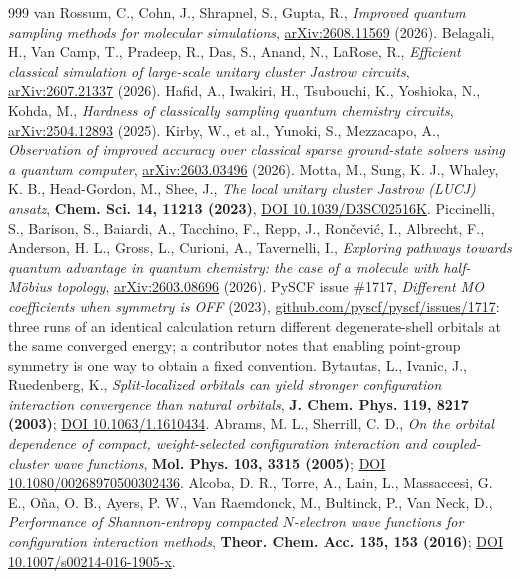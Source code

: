 \documentclass[onecolumn,a4paper]{quantumarticle}
\begin{document}
\begin{thebibliography}{999}
 van Rossum, C., Cohn, J., Shrapnel, S., Gupta, R., \emph{Improved quantum sampling methods for molecular simulations}, \href{https://arxiv.org/abs/2608.11569}{arXiv:2608.11569} (2026).
 Belagali, H., Van Camp, T., Pradeep, R., Das, S., Anand, N., LaRose, R., \emph{Efficient classical simulation of large-scale unitary cluster Jastrow circuits}, \href{https://arxiv.org/abs/2607.21337}{arXiv:2607.21337} (2026).
 Hafid, A., Iwakiri, H., Tsubouchi, K., Yoshioka, N., Kohda, M., \emph{Hardness of classically sampling quantum chemistry circuits}, \href{https://arxiv.org/abs/2504.12893}{arXiv:2504.12893} (2025).
 Kirby, W., et al., Yunoki, S., Mezzacapo, A., \emph{Observation of improved accuracy over classical sparse ground-state solvers using a quantum computer}, \href{https://arxiv.org/abs/2603.03496}{arXiv:2603.03496} (2026).
 Motta, M., Sung, K. J., Whaley, K. B., Head-Gordon, M., Shee, J., \emph{The local unitary cluster Jastrow (LUCJ) ansatz}, \textbf{Chem. Sci. 14, 11213 (2023)}, \href{https://doi.org/10.1039/D3SC02516K}{DOI 10.1039/D3SC02516K}.
 Piccinelli, S., Barison, S., Baiardi, A., Tacchino, F., Repp, J., Ron\v{c}evi\'c, I., Albrecht, F., Anderson, H. L., Gross, L., Curioni, A., Tavernelli, I., \emph{Exploring pathways towards quantum advantage in quantum chemistry: the case of a molecule with half-M\"obius topology}, \href{https://arxiv.org/abs/2603.08696}{arXiv:2603.08696} (2026).
 PySCF issue \#1717, \emph{Different MO coefficients when symmetry is OFF} (2023), \href{https://github.com/pyscf/pyscf/issues/1717}{github.com/pyscf/pyscf/issues/1717}: three runs of an identical calculation return different degenerate-shell orbitals at the same converged energy; a contributor notes that enabling point-group symmetry is one way to obtain a fixed convention.
 Bytautas, L., Ivanic, J., Ruedenberg, K., \emph{Split-localized orbitals can yield stronger configuration interaction convergence than natural orbitals}, \textbf{J. Chem. Phys. 119, 8217 (2003)}; \href{https://doi.org/10.1063/1.1610434}{DOI 10.1063/1.1610434}.
 Abrams, M. L., Sherrill, C. D., \emph{On the orbital dependence of compact, weight-selected configuration interaction and coupled-cluster wave functions}, \textbf{Mol. Phys. 103, 3315 (2005)}; \href{https://doi.org/10.1080/00268970500302436}{DOI 10.1080/00268970500302436}.
 Alcoba, D. R., Torre, A., Lain, L., Massaccesi, G. E., O\~na, O. B., Ayers, P. W., Van Raemdonck, M., Bultinck, P., Van Neck, D., \emph{Performance of Shannon-entropy compacted $N$-electron wave functions for configuration interaction methods}, \textbf{Theor. Chem. Acc. 135, 153 (2016)}; \href{https://doi.org/10.1007/s00214-016-1905-x}{DOI 10.1007/s00214-016-1905-x}.

\end{thebibliography}
\end{document}
